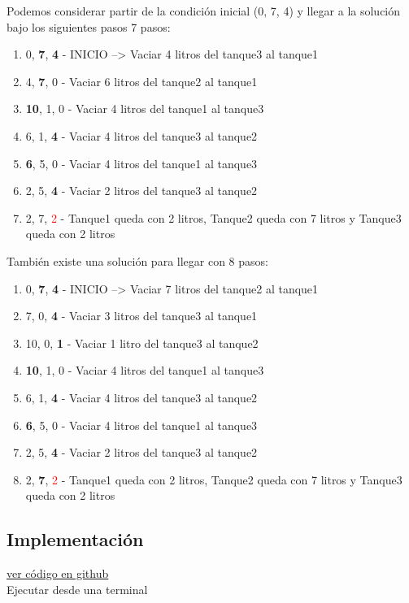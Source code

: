 \documentclass{article}
\begin{document}
Podemos considerar partir de la condición inicial (0, 7, 4) y llegar a la solución bajo los siguientes pasos 7 pasos:
\begin{enumerate}
\item 0, \textbf{7}, \textbf{4} - INICIO --> Vaciar 4 litros del tanque3 al tanque1
\item 4, \textbf{7}, 0 - Vaciar 6 litros del tanque2 al tanque1
\item \textbf{10}, 1, 0 - Vaciar 4 litros del tanque1 al tanque3
\item 6, 1, \textbf{4} - Vaciar 4 litros del tanque3 al tanque2
\item \textbf{6}, 5, 0 - Vaciar 4 litros del tanque1 al tanque3
\item 2, 5, \textbf{4} - Vaciar 2 litros del tanque3 al tanque2
\item 2, 7, \textcolor{red}{2} - Tanque1 queda con 2 litros, Tanque2 queda con 7 litros y Tanque3 queda con 2 litros
\end{enumerate}

También existe una solución para llegar con 8 pasos:
\begin{enumerate}
\item 0, \textbf{7}, \textbf{4} - INICIO --> Vaciar 7 litros del tanque2 al tanque1
\item 7, 0, \textbf{4} - Vaciar 3 litros del tanque3 al tanque1
\item 10, 0, \textbf{1} - Vaciar 1 litro del tanque3 al tanque2
\item \textbf{10}, 1, 0 - Vaciar 4 litros del tanque1 al tanque3
\item 6, 1, \textbf{4} - Vaciar 4 litros del tanque3 al tanque2
\item \textbf{6}, 5, 0 - Vaciar 4 litros del tanque1 al tanque3
\item 2, 5, \textbf{4} - Vaciar 2 litros del tanque3 al tanque2
\item 2, \textbf{7}, \textcolor{red}{2} - Tanque1 queda con 2 litros, Tanque2 queda con 7 litros y Tanque3 queda con 2 litros
\end{enumerate}


\subsection{Implementación}
\href{https://github.com/luisballado/ADA/blob/main/practice_code/tarea4_contenedores.cpp}{ver código en github}\\

Ejecutar desde una terminal
\end{document}
